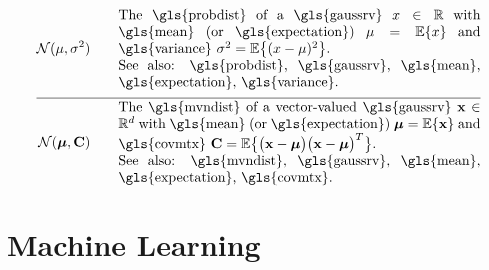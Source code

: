 \newpage
\begin{align} 
	\mathcal{N}(\mu, \sigma^{2}) \quad\quad & \parbox{.75\textwidth}{The \gls{probdist} of a 
		\gls{gaussrv} $\feature \in \mathbb{R}$ with \gls{mean} (or \gls{expectation}) $\mu= \expect \{ \feature \}$ 
		and \gls{variance} $\sigma^{2} =   \expect \big\{  (  \feature - \mu )^2 \big\}$.
		\\ See also: \gls{probdist}, \gls{gaussrv}, \gls{mean}, \gls{expectation}, \gls{variance}.} \nonumber    \nonumber \\[2mm] \hline \nonumber\\[-5mm]
	\mathcal{N}(\clustermean, \mathbf{C}) \quad\quad & \parbox{.75\textwidth}{The \gls{mvndist} of a vector-valued 
		\gls{gaussrv} $\featurevec \in \mathbb{R}^{\featuredim}$ with \gls{mean} (or \gls{expectation}) $\clustermean= \expect \{ \featurevec \}$ 
		and \gls{covmtx} $\mathbf{C} =  \expect \big\{ \big( \featurevec - \clustermean \big)\big( \featurevec - \clustermean \big)^{T} \big\}$.
		\\ See also: \gls{mvndist}, \gls{gaussrv}, \gls{mean}, \gls{expectation}, \gls{covmtx}.} \nonumber                                             
\end{align}





\newpage
\section*{Machine Learning}

